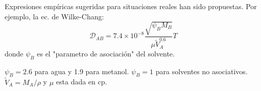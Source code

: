 Expresiones empíricas sugeridas para situaciones reales han sido propuestas. Por ejemplo, la ec. de Wilke-Chang:
\begin{equation}
    \mathscr{D}_{AB}=7.4\times10^{-8}\frac{\sqrt{\psi_BM_B}}{\mu \widetilde{V}_A^{0.6}}T
\tag{1.62}\label{eq_1.62}
\end{equation}
donde $\psi_B$ es el "parametro de asociación" del solvente.

$\psi_B=2.6$ para agua y 1.9 para metanol.
$\psi_B=1$ para solventes no asociativos. $\widetilde{V}_A=M_A/\rho$ y $\mu$ esta dada en cp.



  
